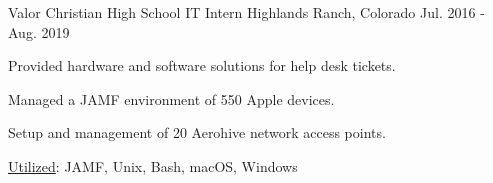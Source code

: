 \begin{cventries}
  \cventry
    {Valor Christian High School} %
    {IT Intern} %
    {Highlands Ranch, Colorado} %
    {Jul. 2016 - Aug. 2019} %
    {
      \begin{cvitems} %
        \item {Provided hardware and software solutions for help desk tickets.}
        \item {Managed a JAMF environment of 550 Apple devices.}
        \item {Setup and management of 20 Aerohive network access points.}
        \item {\underline{Utilized}:  JAMF, Unix, Bash, macOS, Windows}
      \end{cvitems}
    }

\end{cventries}
